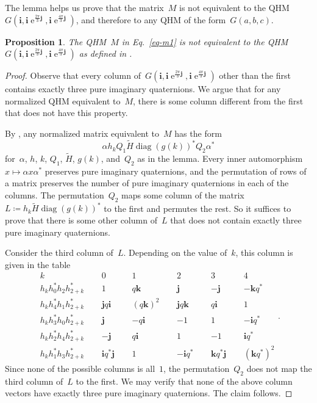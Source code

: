 \documentclass[12pt]{article}
\numberwithin{equation}{section}
\newtheorem{proposition}[theorem]{Proposition}
\newcommand{\qi}{\mathbf{i}}
\newcommand{\qj}{\mathbf{j}}
\newcommand{\qk}{\mathbf{k}}
\newcommand{\adjoint}{*}
\newcommand{\eqdef}{\coloneqq}
\DeclareMathOperator{\e}{e}
\DeclareMathOperator{\diag}{diag}
\newcommand{\tH}{\widetilde{H}}
\begin{document}
The lemma helps us prove that the matrix~$M$ is not equivalent to the QHM~$G(\qi, \qi \e^{\frac{2\pi}{3} \qj}, \qi \e^{\frac{4\pi}{3} \qj})$, and therefore to any QHM of the form~$G(a,b,c)$.
\begin{proposition}
\label{prop-noneq-gabc}
The QHM\/~$M$ in Eq.~\eqref{eq-m1} is not equivalent to the QHM\/ $G(\qi, \qi \e^{\frac{2\pi}{3} \qj}, \qi \e^{\frac{4\pi}{3} \qj})$ as defined in .
\end{proposition}
\begin{proof}
Observe that every column of~$G(\qi, \qi \e^{\frac{2\pi}{3} \qj}, \qi \e^{\frac{4\pi}{3} \qj}) $ other than the first contains exactly three pure imaginary quaternions. We argue that for any normalized QHM equivalent to~$M$, there is some column different from the first that does not have this property.

By , any normalized matrix equivalent to~$M$ has the form
\[
\alpha h_k Q_1 \tH \diag(g(k))^\adjoint Q_2 \alpha^*
\]
for~$\alpha$, $h$, $k$, $Q_1$, $\tH$, $g(k)$, and~$Q_2$ as in the lemma. Every inner automorphism~$x \mapsto \alpha x \alpha^*$ preserves pure imaginary quaternions, and the permutation of rows of a matrix preserves the number of pure imaginary quaternions in each of the columns. The permutation~$Q_2$ maps some column of the matrix~$L \eqdef h_k \tH \diag(g(k))^\adjoint $ to the first and permutes the rest. So it suffices to prove that there is some other column of~$L$ that does not contain exactly three pure imaginary quaternions.

Consider the third column of~$L$.
Depending on the value of~$k$, this column is given in the table
\begin{equation}
\label{eq-3rd-column}
\begin{array}{c|cccccccccc}
k & ~~ & 0 & ~~ & 1 & ~~ & 2 & ~~ & 3 & ~~ & 4 \\ \hline
h_k h_0^* h_2 h_{2 + k}^* && 1           && q \qk     && \qj       && -\qj        && -\qk q^* \\
h_k h_4^* h_1 h_{2 + k}^* && \qj q \qi   && (q \qk)^2 && \qj q \qk && q \qi       && 1 \\
h_k h_3^* h_0 h_{2 + k}^* && \qj         && - q \qi   && -1        && 1           && -\qi q^* \\
h_k h_2^* h_4 h_{2 + k}^* && -\qj        && q \qi     && 1         && -1          && \qi q^* \\
h_k h_1^* h_3 h_{2 + k}^* && \qi q^* \qj && 1         && -\qi q^*  && \qk q^* \qj && (\qk q^*)^2
\end{array}.
\end{equation}
Since none of the possible columns is all~$1$, the permutation~$Q_2$ does not map the third column of~$L$ to the first. We may verify that none of the above column vectors have exactly three pure imaginary quaternions. The claim follows.
\end{proof}
\end{document}
